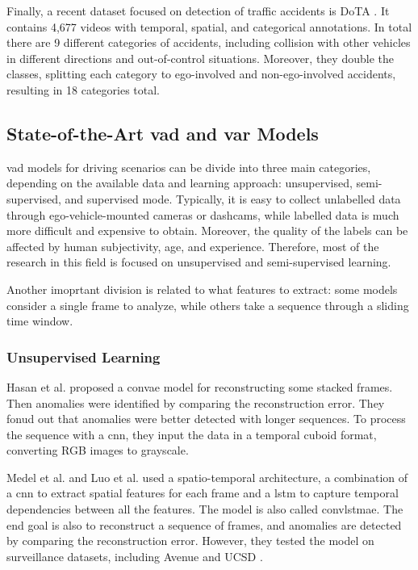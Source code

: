 Finally, a recent dataset focused on detection of traffic accidents is DoTA 
\cite{dota_dataset}. It contains 4,677 videos with temporal, spatial, and 
categorical annotations. In total there are 9 different categories of accidents,
including collision with other vehicles in different directions and out-of-control 
situations. Moreover, they double the classes, splitting each category to 
ego-involved and non-ego-involved accidents, resulting in 18 categories total.

\subsection{State-of-the-Art \ac{vad} and \ac{var} Models}
\acl{vad} models for driving scenarios can be divide into three main categories, 
depending on the available data and learning approach: 
unsupervised, semi-supervised, and supervised mode.
Typically, it is easy to collect unlabelled data through ego-vehicle-mounted 
cameras or dashcams, while labelled data is much more difficult and expensive 
to obtain. Moreover, the quality of the labels can be affected by human 
subjectivity, age, and experience. Therefore, most of the research in this 
field is focused on unsupervised and semi-supervised learning.

Another imoprtant division is related to what features to extract: some models 
consider a single frame to analyze, while others take a sequence through a 
sliding time window. 

\subsubsection{Unsupervised Learning}
Hasan et al. \cite{hasan_convae} proposed a \ac{convae} model for reconstructing 
some stacked frames. Then anomalies were identified by comparing the 
reconstruction error. They fonud out that anomalies were better detected with 
longer sequences. To process the sequence with a \ac{cnn}, they input the data 
in a temporal cuboid format, converting RGB images to grayscale.

Medel et al. \cite{medel_lstmconvae} and Luo et al. \cite{luo_lstmconvae}
 used a spatio-temporal architecture, a 
combination of a \ac{cnn} to extract spatial features for each frame and a 
\ac{lstm} to capture temporal dependencies between all the features. 
The model is also called \ac{convlstmae}.
The end 
goal is also to reconstruct a sequence of frames, and anomalies are detected 
by comparing the reconstruction error. However, they tested the model on 
surveillance datasets, including Avenue \cite{a3d} and UCSD \cite{ucsd}.

